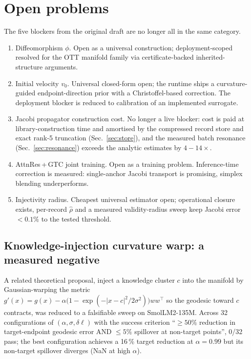 \documentclass[11pt]{article}
\begin{document}
\section{Open problems}

The five blockers from the original draft are no longer all in the same
category.

\begin{enumerate}
  \item Diffeomorphism $\phi$. Open as a universal construction;
        deployment-scoped resolved for the OTT manifold family via
        certificate-backed inherited-structure arguments.
  \item Initial velocity $v_0$. Universal closed-form open; the
        runtime ships a curvature-guided endpoint-direction prior with a
        Christoffel-based correction. The deployment blocker is reduced to
        calibration of an implemented surrogate.
  \item Jacobi propagator construction cost. No longer a live blocker:
        cost is paid at library-construction time and amortised by the
        compressed record store and exact rank-5 truncation
        (Sec.~\ref{sec:store}), and the measured batch resonance
        (Sec.~\ref{sec:resonance}) exceeds the analytic estimates by
        $4\!-\!14\times$.
  \item AttnRes\,+\,GTC joint training. Open as a training problem.
        Inference-time correction is measured: single-anchor Jacobi transport
        is promising, simplex blending underperforms.
  \item Injectivity radius. Cheapest universal estimator open;
        operational closure exists, per-record $\hat\rho$ and a measured
        validity-radius sweep keep Jacobi error $<0.1\%$ to the tested
        threshold.
\end{enumerate}

\subsection{Knowledge-injection curvature warp: a measured negative}
\label{sec:curvature-warp-negative}
A related theoretical proposal, inject a knowledge cluster $c$ into
the manifold by Gaussian-warping the metric
$g'(x){=}g(x){-}\alpha\bigl(1{-}\exp(-|x{-}c|^2/2\sigma^2)\bigr)ww^\top$
so the geodesic toward $c$ contracts, was reduced to a falsifiable
sweep on SmolLM2-135M. Across 32 configurations of
$(\alpha,\sigma,\delta\ell)$ with the success criterion
``$\geq 50\%$ reduction in target-endpoint geodesic error AND
$\leq 5\%$ spillover at non-target points'', 0/32 pass;
the best configuration achieves a 16\,\% target reduction at
$\alpha{=}0.99$ but its non-target spillover diverges (NaN at high
$\alpha$).
\end{document}
